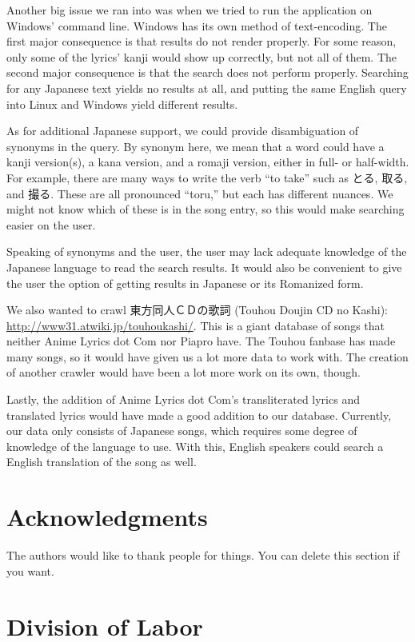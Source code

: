 \documentclass{acm} %
\begin{document}
\begin{CJK}{UTF8}{zhsong}
Another big issue we ran into was when we tried to run the application on Windows' command line. Windows has its own method of text-encoding. The first major consequence is that results do not render properly. For some reason, only some of the lyrics' kanji would show up correctly, but not all of them. The second major consequence is that the search does not perform properly. Searching for any Japanese text yields no results at all, and putting the same English query into Linux and Windows yield different results.

As for additional Japanese support, we could provide disambiguation of synonyms in the query. By synonym here, we mean that a word could have a kanji version(s), a kana version, and a romaji version, either in full- or half-width. For example, there are many ways to write the verb ``to take'' such as とる, 取る, and 撮る. These are all pronounced ``toru,'' but each has different nuances. We might not know which of these is in the song entry, so this would make searching easier on the user.

Speaking of synonyms and the user, the user may lack adequate knowledge of the Japanese language to read the search results. It would also be convenient to give the user the option of getting results in Japanese or its Romanized form.

We also wanted to crawl 東方同人ＣＤの歌詞 (Touhou Doujin CD no Kashi): \url{http://www31.atwiki.jp/touhoukashi/}. This is a giant database of songs that neither Anime Lyrics dot Com nor Piapro have. The Touhou fanbase has made many songs, so it would have given us a lot more data to work with. The creation of another crawler would have been a lot more work on its own, though.

Lastly, the addition of Anime Lyrics dot Com's transliterated lyrics and translated lyrics would have made a good addition to our database. Currently, our data only consists of Japanese songs, which requires some degree of knowledge of the language to use. With this, English speakers could search a English translation of the song as well.

\section*{Acknowledgments}

The authors would like to thank people for things. You can delete this section
if you want.

\appendix

\section{Division of Labor}


\end{CJK}
\end{document}
